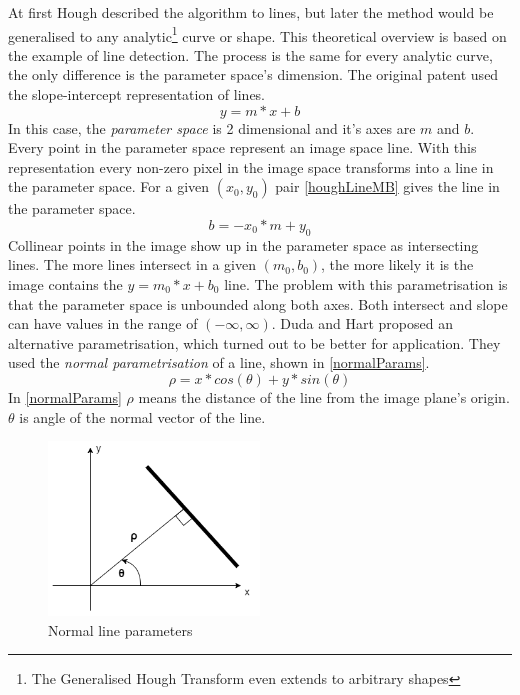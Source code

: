 At first Hough described the algorithm to lines, but later the method would be generalised to any analytic\footnote{The Generalised Hough Transform even extends to arbitrary shapes} curve or shape.
This theoretical overview is based on the example of line detection.
The process is the same for every analytic curve, the only difference is the parameter space's dimension.
The original patent\cite{houghPatent} used the slope-intercept representation of lines.
\begin{equation}
y = m*x + b
\end{equation}
In this case, the \emph{parameter space} is 2 dimensional and it's axes are $m$ and $b$.
Every point in the parameter space represent an image space line.
With this representation every non-zero pixel in the image space transforms into a line in the parameter space.
For a given $(x_0,y_0)$ pair \eqref{houghLineMB} gives the line in the parameter space. 
\begin{equation}
\label{eq:houghLineMB}
b = -x_0*m + y_0
\end{equation}
Collinear points in the image show up in the parameter space as intersecting lines.
The more lines intersect in a given $(m_0,b_0)$, the more likely it is the image contains the $y = m_0*x + b_0$ line.
The problem with this parametrisation is that the parameter space is unbounded along both axes.
Both intersect and slope can have values in the range of $(-\infty, \infty)$.
Duda and Hart\cite{houghThetaRho} proposed an alternative parametrisation, which turned out to be better for application.
They used the \emph{normal parametrisation} of a line, shown in \eqref{normalParams}.
\begin{equation}
	\label{eq:normalParams}
	\rho = x*cos(\theta) + y*sin(\theta)
\end{equation}
In \eqref{normalParams} $\rho$ means the distance of the line from the image plane's origin.
$\theta$ is angle of the normal vector of the line.
\begin{figure}[ht]
	\centering
	\includegraphics[width=0.5\textwidth]{figures/line_params.png}
	\caption{Normal line parameters}
	\label{fig:normalLineParams}
\end{figure}
